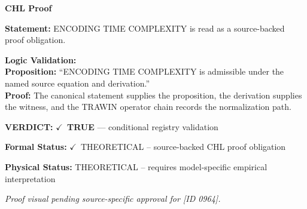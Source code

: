\vspace{0.45em}
\noindent\textbf{CHL Proof}\par
\textbf{Statement:} ENCODING TIME COMPLEXITY is read as a source-backed proof obligation.

\textbf{Logic Validation:}\\
\textbf{Proposition:} ``ENCODING TIME COMPLEXITY is admissible under the named source equation and derivation.''\\
\textbf{Proof:} The canonical statement supplies the proposition, the derivation supplies the witness, and the TRAWIN operator chain records the normalization path.

\textbf{VERDICT:} \ensuremath{\checkmark}\ \textbf{TRUE} --- conditional registry validation

\textbf{Formal Status:} \ensuremath{\checkmark}\ THEORETICAL -- source-backed CHL proof obligation

\textbf{Physical Status:} THEORETICAL -- requires model-specific empirical interpretation
\par\vspace{0.45em}
\par
\vfill
\begingroup\footnotesize\itshape
Proof visual pending source-specific approval for [ID 0964].
\par\endgroup
\vfill
\endgroup
\endgroup
